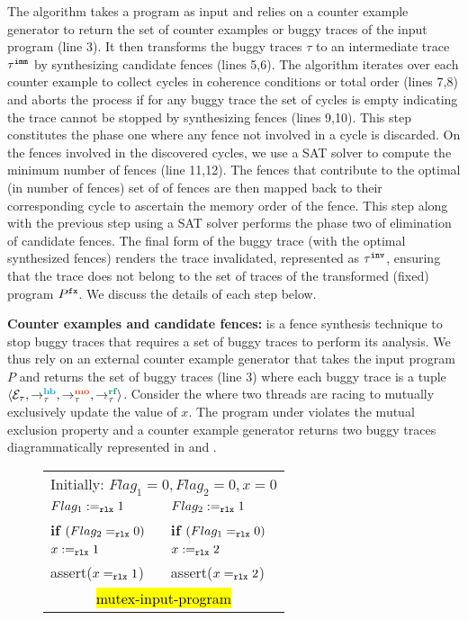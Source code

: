 The algorithm takes a \cc program as input and relies on a 
counter example generator to return the set of counter 
examples or buggy traces of the input program (line 3).
It then transforms the buggy traces $\tau$ to an intermediate 
trace ${\tau}^{\mathtt{imm}}$ by synthesizing candidate 
fences (lines 5,6).
%
The algorithm iterates over each counter example to 
collect cycles in coherence conditions or \sc total order
(lines 7,8) and aborts the process if for any buggy trace
the set of cycles is empty indicating the trace cannot be 
stopped by synthesizing \cc fences (lines 9,10).
This step constitutes the phase one where any fence not
involved in a cycle is discarded.
%
On the fences involved in the discovered cycles, we use a
SAT solver to compute the minimum number of fences
(line 11,12). 
%
The fences that contribute to the optimal (in number of
fences) set of of fences are then mapped back to their 
corresponding cycle to ascertain the memory order of 
the fence.
%
This step along with the previous step using a SAT solver
performs the phase two of elimination of candidate fences.
%
The final form of the buggy trace (with the optimal 
synthesized fences) renders the trace invalidated,
represented as ${\tau}^{\mathtt{inv}}$, ensuring that the trace 
does not belong to the set of traces of the transformed
(fixed) program ${P}^{\mathtt{fx}}$. 
%
We discuss the details of each step below.

\noindent
{\bf Counter examples and candidate fences:}
\ourtechnique is a fence synthesis technique to stop
buggy traces that requires a set of buggy traces to 
perform its analysis. We thus rely on an external counter
example generator that takes the input program $P$ and
returns the set of buggy traces (line 3) where each buggy 
trace is a tuple $\langle \events_\tau, \setHB, \setMO, 
\setRF \rangle$.
%
Consider the  where two 
threads are racing to mutually exclusively update the
value of $x$. The program under \cc violates the 
mutual exclusion property and a counter example generator
returns two buggy traces diagrammatically represented in
 and .

\begin{figure}[!htb]
	\begin{center}
		\setlength{\tabcolsep}{5pt}
		\begin{tabular}{|l||l|}
			\hline
			\multicolumn{2}{|c|}{Initially: $Flag_1=0, Flag_2 = 0, x=0$} \\
			
			$ Flag_1 :=_\texttt{rlx} 1 $ & $ Flag_2 :=_\texttt{rlx} 1  $ \\
			\textbf{if} $ (Flag_2 =_\texttt{rlx} 0) $ & \textbf{if} $ (Flag_1 =_\texttt{rlx} 0) $ \\
			\quad $ x :=_\texttt{rlx} 1 $ & \quad $ x :=_\texttt{rlx} 2 $ \\
			\quad assert($ x =_\texttt{rlx} 1 $) & \quad assert($ x =_\texttt{rlx} 2 $) \\
			\hline
			
			\multicolumn{2}{c}{\hl{mutex-input-program}}
		\end{tabular} 
	\end{center}
\end{figure}

